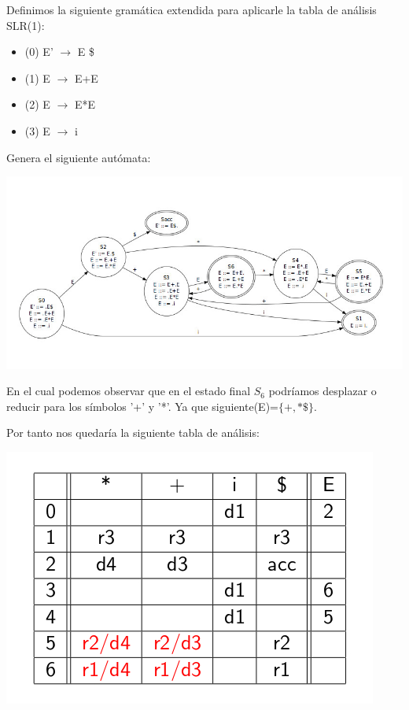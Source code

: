 \documentclass{apuntes}
\begin{document}
\begin{example}
Definimos la siguiente gramática extendida para aplicarle la tabla de análisis SLR(1):

\begin{itemize}
\item (0) E' $\rightarrow$ E \$
\item (1) E $\rightarrow$ E+E
\item (2) E $\rightarrow$ E*E
\item (3) E $\rightarrow$ i
\end{itemize}

Genera el siguiente autómata:
\begin{center}
\includegraphics[scale=0.5]{img/automataslr1conflicto.jpg}
\end{center}

En el cual podemos observar que en el estado final $S_6$ podríamos desplazar o reducir para los símbolos '+' y '*'. Ya que siguiente(E)=$\{+,*\$\}$.

\newpage
Por tanto nos quedaría la siguiente tabla de análisis:

\begin{center}
\includegraphics[scale=0.4]{img/tablaanalisisslr1conflicto.jpg}
\end{center}
\end{example}
\end{document}
